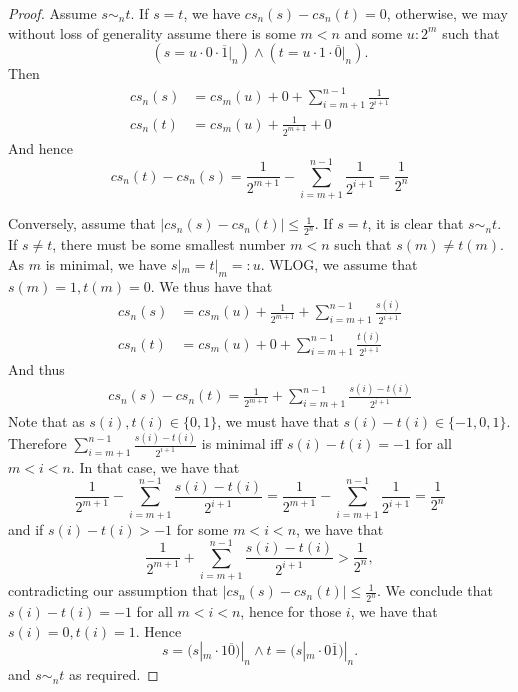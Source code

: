 \begin{proof}
  \item  
    Assume $ s \sim_n t$. If $s=t$, we have $cs_n(s) - cs_n(t) = 0$, 
    otherwise, we may without loss of generality assume there is some $m<n$ and some $u:2^m$ such that 
  \begin{equation}
    (s = u \cdot 0 \cdot \overline 1|_n) \wedge ( t = u \cdot 1 \cdot \overline 0 |_n) . 
  \end{equation}
  Then 
  \begin{align}
    cs_n(s) &= 
    cs_m(u) + 0 + \sum\limits_{i = m+1}^{n-1} \frac{1}{2^{i+1}}\\
    cs_n(t) &= 
    cs_m(u) + \frac{1}{2^{m+1}} + 0  
  \end{align}
  And hence 
  \begin{equation}
    cs_n(t) - cs_n(s) = \frac{1}{2^{m+1}} - \sum\limits_{i = m+1}^{n-1} \frac{1}{2^{i+1}} = \frac{1}{2^n}
  \end{equation}
  
  \item 
  Conversely, assume that $|cs_n(s) - cs_n(t)| \leq \frac{1}{2^n}$. 
  If $s = t$, it is clear that $s \sim_n t$.
  If $s\neq t$, there must be some smallest number $m<n$ such that 
  $s(m) \neq t(m)$. As $m$ is minimal, we have $s|_m = t|_m = : u$. 
  WLOG, we assume that $s(m) = 1, t(m) = 0$. 
  We thus have that 
  \begin{align}
    cs_n(s) &= 
    cs_m(u) + \frac1{2^{m+1}} + \sum\limits_{i = m+1}^{n-1} \frac{s(i)}{2^{i+1}}\\
    cs_n(t) &= 
    cs_m(u) + 0  + \sum\limits_{i = m+1}^{n-1} \frac{t(i)}{2^{i+1}}
  \end{align}
  And thus 
  \begin{align}
    cs_n(s)-cs_n(t) = \frac{1}{2^{m+1}} + \sum\limits_{i = m+1}^{n-1} \frac{s(i)-t(i)}{2^{i+1}}
  \end{align}
  Note that as $s(i),t(i) \in \{0,1\}$, we must have that $s(i) -t(i) \in \{-1,0,1\}$. 
  Therefore 
  $\sum\limits_{i = m+1}^{n-1} \frac{s(i)-t(i)}{2^{i+1}}$
  is minimal iff $s(i) -t(i) = -1$ for all $m<i<n$. 
  In that case, we have that 
  $$
  \frac{1}{2^{m+1}}-
  \sum\limits_{i = m+1}^{n-1} \frac{s(i)-t(i)}{2^{i+1}}= 
  \frac{1}{2^{m+1}}-
  \sum\limits_{i = m+1}^{n-1} \frac{1}{2^{i+1}}= 
  \frac{1}{2^n}
  $$
  and if $s(i) -t(i) > -1$ for some $m<i<n$, we have that 
    $$
    \frac{1}{2^{m+1}} + \sum\limits_{i = m+1}^{n-1} \frac{s(i)-t(i)}{2^{i+1}}> \frac{1}{2^n},$$
  contradicting our assumption that 
  $|cs_n(s) - cs_n(t)| \leq \frac{1}{2^n}$. 
  We conclude that $s(i) -t(i) = -1$ for all $m<i<n$, hence for those $i$, we have that 
  $s(i) = 0, t(i) = 1$. Hence 
  \begin{equation}s = (s|_m \cdot 1\overline 0) |_n \wedge 
  t = (s|_m \cdot 0 \overline 1) |_n.
  \end{equation}
  and $s\sim_n t$ as required. 
\end{proof}


